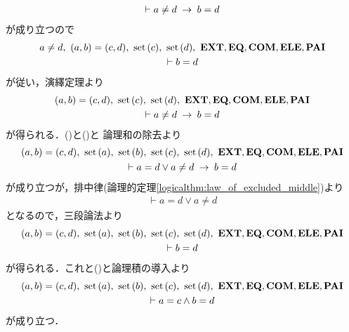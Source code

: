 \begin{sketch}
\begin{description}
\begin{align}
\begin{gathered}
						\vdash a \neq d \hspace{0.25em}\rightarrow\hspace{0.25em} b = d
					\end{gathered}
				\end{align}
				が成り立つので
				\begin{align}
					\begin{gathered}
						a \neq d,\ (a,b) = (c,d),\ \set{c},\ \set{d},\ \EXTAX,\EQAX,\COMAX,\ELEAX,\PAIAX \\
						\vdash b = d
					\end{gathered}
				\end{align}
				が従い，演繹定理より
				\begin{align}
					\begin{gathered}
						(a,b) = (c,d),\ \set{c},\ \set{d},\ \EXTAX,\EQAX,\COMAX,\ELEAX,\PAIAX \\
						\vdash a \neq d \rarrow b = d
					\end{gathered}
					\label{fom:equality_of_ordered_pairs_18}
				\end{align}
				が得られる．()と()と
				論理和の除去より
				\begin{align}
					\begin{gathered}
						(a,b) = (c,d),\ \set{a},\ \set{b},\ \set{c},\ \set{d},\ \EXTAX,\EQAX,\COMAX,\ELEAX,\PAIAX \\
						\vdash a = d \vee a \neq d \rarrow b = d
					\end{gathered}
				\end{align}
				が成り立つが，排中律(論理的定理\ref{logicalthm:law_of_excluded_middle})より
				\begin{align}
					\vdash a = d \vee a \neq d
				\end{align}
				となるので，三段論法より
				\begin{align}
					\begin{gathered}
						(a,b) = (c,d),\ \set{a},\ \set{b},\ \set{c},\ \set{d},\ \EXTAX,\EQAX,\COMAX,\ELEAX,\PAIAX \\
						\vdash b = d
					\end{gathered}
				\end{align}
				が得られる．これと()と論理積の導入より
				\begin{align}
					\begin{gathered}
						(a,b) = (c,d),\ \set{a},\ \set{b},\ \set{c},\ \set{d},\ \EXTAX,\EQAX,\COMAX,\ELEAX,\PAIAX \\
						\vdash a = c \wedge b = d
					\end{gathered}
				\end{align}
				が成り立つ．
				\QED
		\end{description}
	\end{sketch}
	
